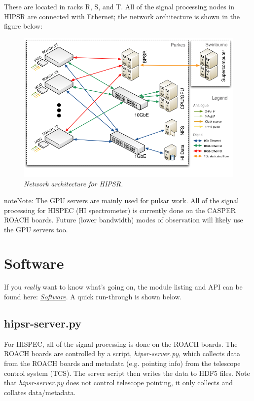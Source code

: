 \documentclass[letterpaper,10pt,english]{sphinxmanual}
\begin{document}
These are located in racks R, S, and T. All of the signal processing nodes in HIPSR
are connected with Ethernet; the network architecture is shown in the figure below:
\begin{figure}[htbp]
\centering
\capstart

\includegraphics{HIPSR_arch.png}
\caption{\emph{Network architecture for HIPSR.}}\end{figure}

\begin{notice}{note}{Note:}
The GPU servers are mainly used for pulsar work. All of the signal processing for HISPEC
(HI spectrometer) is currently done on the CASPER ROACH boards. Future (lower bandwidth)
modes of observation will likely use the GPU servers too.
\end{notice}


\section{Software}
\label{overview:software}
If you \emph{really} want to know
what's going on, the module listing and API can be found here: {\hyperref[software:software-chapter]{\emph{Software}}}.
A quick run-through is shown below.


\subsection{hipsr-server.py}
\label{overview:hipsr-server-py}
For HISPEC, all of the signal processing is done on the ROACH boards. The ROACH boards are
controlled by a script, \emph{hipsr-server.py}, which collects data from the ROACH boards and
metadata (e.g. pointing info) from the telescope control system (TCS). The server script then
writes the data to HDF5 files. Note that \emph{hipsr-server.py} does not control telescope pointing,
it only collects and collates data/metadata.
\end{document}
